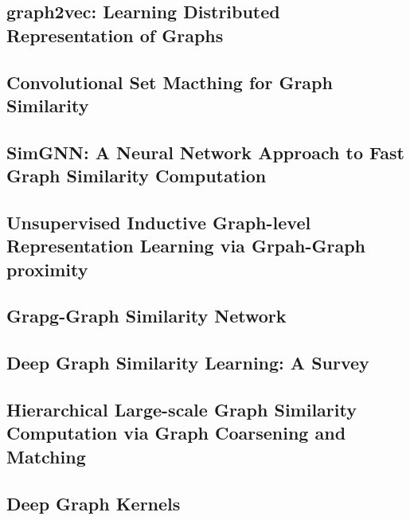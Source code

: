 \subsection{graph2vec: Learning Distributed Representation of Graphs}


\subsection{Convolutional Set Macthing for Graph Similarity\label{sec:GSimCNN}}




\subsection{SimGNN: A Neural Network Approach to Fast Graph Similarity Computation\label{sec:SimCNN}}


\subsection{Unsupervised Inductive Graph-level Representation Learning via Grpah-Graph proximity}


\subsection{Grapg-Graph Similarity Network}


\subsection{Deep Graph Similarity Learning: A Survey}


\subsection{Hierarchical Large-scale Graph Similarity Computation via Graph Coarsening and Matching}


\subsection{Deep Graph Kernels}
